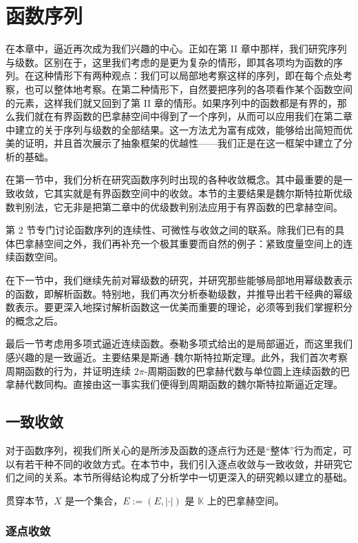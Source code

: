 \chapter{函数序列}
在本章中，逼近再次成为我们兴趣的中心。正如在第 II 章中那样，我们研究序列与级数。区别在于，这里我们考虑的是更为复杂的情形，即其各项均为函数的序列。在这种情形下有两种观点：我们可以局部地考察这样的序列，即在每个点处考察，也可以整体地考察。在第二种情形下，自然要把序列的各项看作某个函数空间的元素，这样我们就又回到了第 II 章的情形。如果序列中的函数都是有界的，那么我们就在有界函数的巴拿赫空间中得到了一个序列，从而可以应用我们在第二章中建立的关于序列与级数的全部结果。这一方法尤为富有成效，能够给出简短而优美的证明，并且首次展示了抽象框架的优越性——我们正是在这一框架中建立了分析的基础。

在第一节中，我们分析在研究函数序列时出现的各种收敛概念。其中最重要的是一致收敛，它其实就是有界函数空间中的收敛。本节的主要结果是魏尔斯特拉斯优级数判别法，它无非是把第二章中的优级数判别法应用于有界函数的巴拿赫空间。

第 2 节专门讨论函数序列的连续性、可微性与收敛之间的联系。除我们已有的具体巴拿赫空间之外，我们再补充一个极其重要而自然的例子：紧致度量空间上的连续函数空间。

在下一节中，我们继续先前对幂级数的研究，并研究那些能够局部地用幂级数表示的函数，即解析函数。特别地，我们再次分析泰勒级数，并推导出若干经典的幂级数表示。要更深入地探讨解析函数这一优美而重要的理论，必须等到我们掌握积分的概念之后。

最后一节考虑用多项式逼近连续函数。泰勒多项式给出的是局部逼近，而这里我们感兴趣的是一致逼近。主要结果是斯通–魏尔斯特拉斯定理。此外，我们首次考察周期函数的行为，并证明连续 $ 2\pi $-周期函数的巴拿赫代数与单位圆上连续函数的巴拿赫代数同构。直接由这一事实我们便得到周期函数的魏尔斯特拉斯逼近定理。

\section{一致收敛}

对于函数序列，视我们所关心的是所涉及函数的逐点行为还是“整体”行为而定，可以有若干种不同的收敛方式。在本节中，我们引入逐点收敛与一致收敛，并研究它们之间的关系。本节所得结论构成了分析学中一切更深入的研究赖以建立的基础。

贯穿本节，$X$ 是一个集合，$E := (E, |\cdot|)$ 是 $\mathbb{K}$ 上的巴拿赫空间。

\subsection*{逐点收敛}

